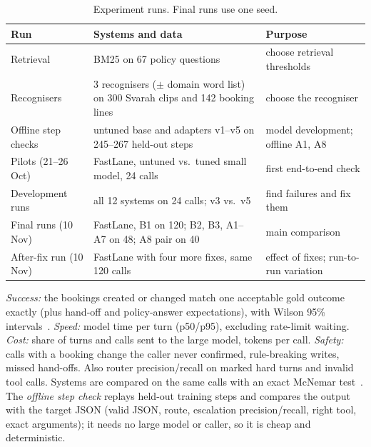 \documentclass[11pt,a4paper]{article}
\makeatletter
\renewcommand\paragraph{\@startsection{paragraph}{4}{\z@}{1.0ex plus 0.5ex minus 0.2ex}{-1em}{\normalsize\bfseries}}
\makeatother
\begin{document}
\begin{table}[tbp]
\centering\small
\begin{tabularx}{\linewidth}{@{}>{\raggedright\arraybackslash}p{3.1cm}L>{\raggedright\arraybackslash}p{4.2cm}@{}}
\toprule
Run & Systems and data & Purpose \\
\midrule
Retrieval & BM25 on 67 policy questions & choose retrieval thresholds \\
Recognisers & 3 recognisers ($\pm$ domain word list) on 300 Svarah clips and 142 booking lines & choose the recogniser \\
Offline step checks & untuned base and adapters v1--v5 on 245--267 held-out steps & model development; offline A1, A8 \\
Pilots (21--26 Oct) & FastLane, untuned vs.\ tuned small model, 24 calls & first end-to-end check \\
Development runs & all 12 systems on 24 calls; v3 vs.\ v5 & find failures and fix them \\
Final runs (10 Nov) & FastLane, B1 on 120; B2, B3, A1--A7 on 48; A8 pair on 40 & main comparison \\
After-fix run (10 Nov) & FastLane with four more fixes, same 120 calls & effect of fixes; run-to-run variation \\
\bottomrule
\end{tabularx}
\caption{Experiment runs. Final runs use one seed.}
\label{tab:allruns}
\end{table}

\paragraph{Metrics.} \emph{Success:} the bookings created or changed match one acceptable gold outcome exactly (plus
hand-off and policy-answer expectations), with Wilson 95\% intervals~\cite{wilson}. \emph{Speed:} model time per turn
(p50/p95), excluding rate-limit waiting. \emph{Cost:} share of turns and calls sent to the large model, tokens per
call. \emph{Safety:} calls with a booking change the caller never confirmed, rule-breaking writes, missed hand-offs.
Also router precision/recall on marked hard turns and invalid tool calls. Systems are compared on the same calls with
an exact McNemar test~\cite{mcnemar}. The \emph{offline step check} replays held-out training steps and compares the
output with the target JSON (valid JSON, route, escalation precision/recall, right tool, exact arguments); it needs no
large model or caller, so it is cheap and deterministic.
\end{document}
